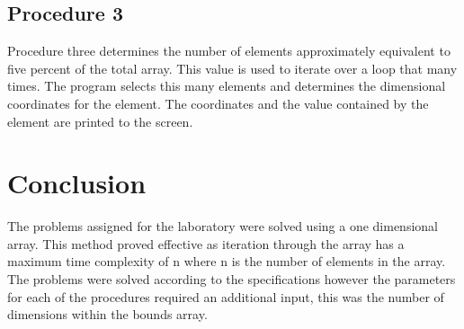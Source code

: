 \documentclass{TechReport}
\begin{document}
\subsection{Procedure 3}
Procedure three determines the number of elements approximately equivalent to five percent of the total array. This value is used to iterate over a loop that many times. The program selects this many elements and determines the dimensional coordinates for the element. The coordinates and the value contained by the element are printed to the screen.


\section{Conclusion}
The problems assigned for the laboratory were solved using a one dimensional array. This method proved effective as iteration through the array has a maximum time complexity of n where n is the number of elements in the array. The problems were solved according to the specifications however the parameters for each of the procedures required an additional input, this was the number of dimensions within the bounds array.  
\end{document}
